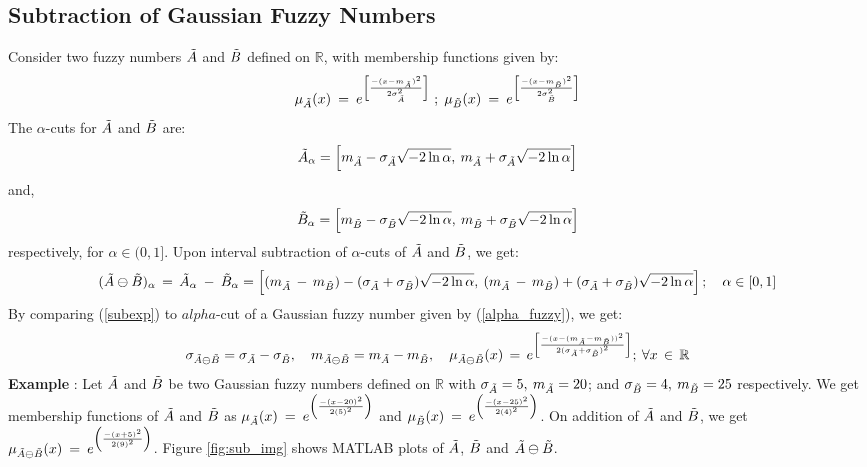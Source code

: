 \documentclass{article}
\begin{document}
\subsection{Subtraction of Gaussian Fuzzy Numbers}
Consider two fuzzy numbers $\Tilde{A}$ and $\Tilde{B}$ defined on $\mathbb{R}$, with membership functions given by:
\[ \mu_{\Tilde{A}}(x) \:=\:e^{\left[ \frac{-(x-m_{\Tilde{A}})^2}{2\sigma_{\Tilde{A}}^{2}} \right]}\;  ; \;\mu_{\Tilde{B}}(x) \: = \:e^{\left[ \frac{-(x-m_{\Tilde{B}})^2}{2\sigma_{\Tilde{B}}^{2}} \right]} \]
The $\alpha$-cuts for $\Tilde{A}$ and $\Tilde{B}$ are: \[ \Tilde{A}_{\alpha} = \left[m_{\Tilde{A}}-\sigma_{\Tilde{A}}\sqrt{-2\ln{\alpha}}, \: m_{\Tilde{A}}+\sigma_{\Tilde{A}}\sqrt{-2\ln{\alpha}} \right]\] and, \[ \Tilde{B}_{\alpha} = \left[m_{\Tilde{B}}-\sigma_{\Tilde{B}}\sqrt{-2\ln{\alpha}}, \: m_{\Tilde{B}}+\sigma_{\Tilde{B}}\sqrt{-2\ln{\alpha}} \right]\] respectively, for $\alpha\in(0,1]$. Upon interval subtraction of $\alpha$-cuts of $\Tilde{A}$ and $\Tilde{B}$, we get:
\begin{equation}\label{subexp}
 (\Tilde{A}\ominus\Tilde{B})_\alpha\,=\, \Tilde{A}_\alpha \: - \: \Tilde{B}_\alpha = \left[(m_{\Tilde{A}}\, - \, m_{\Tilde{B}})-(\sigma_{\Tilde{A}}+\sigma_{\Tilde{B}})\sqrt{-2\ln{\alpha}}, \: (m_{\Tilde{A}}\, - \, m_{\Tilde{B}})+(\sigma_{\Tilde{A}}+\sigma_{\Tilde{B}})\sqrt{-2\ln{\alpha}}\right] ; \quad\alpha\in [0,1]  
\end{equation} \newline By comparing (\ref{subexp}) to $alpha$-cut of a Gaussian fuzzy number given by (\ref{alpha_fuzzy}), we get:
\begin{equation}
    \sigma_{\Tilde{A}\ominus\Tilde{B}} = \sigma_{\Tilde{A}} - \sigma_{\Tilde{B}}, \quad m_{\Tilde{A}\ominus\Tilde{B}} = m_{\Tilde{A}} - m_{\Tilde{B}}, \quad 
    \mu_{\Tilde{A}\ominus\Tilde{B}}(x) \,=\, e^{\left[ \frac{-(x-(m_{\Tilde{A}} - m_{\Tilde{B}} ))^2}{2(\sigma_{\Tilde{A}} + \sigma_{\Tilde{B}} )^{2}} \right]};\: \forall x \,\in\, \mathbb{R}
\end{equation}
\newline
\textbf{Example} : Let $\Tilde{A}$ and $\Tilde{B}$ be two Gaussian fuzzy numbers defined on $\mathbb{R}$ with $\sigma_{\Tilde{A}} = 5, \:m_{\Tilde{A}} = 20$; and $\sigma_{\Tilde{B}} = 4, \:m_{\Tilde{B}} = 25$ respectively. We get membership functions of $\Tilde{A}$ and $\Tilde{B}$ as $\mu_{\Tilde{A}}(x) \:=\:e^{\left( \frac{-(x-20)^2}{2(5)^{2}} \right)}$ and $\mu_{\Tilde{B}}(x) \:=\:e^{\left( \frac{-(x-25)^2}{2(4)^{2}} \right)}$. On addition of $\Tilde{A}$ and $\Tilde{B}$, we get $\mu_{\Tilde{A}\ominus\Tilde{B}}(x) \:=\:e^{\left( \frac{-(x+5)^2}{2(9)^{2}}\right)}$. Figure \ref{fig:sub_img} shows MATLAB plots of $\Tilde{A}$, $\Tilde{B}$ and $\Tilde{A}\ominus\Tilde{B}$.
\end{document}
